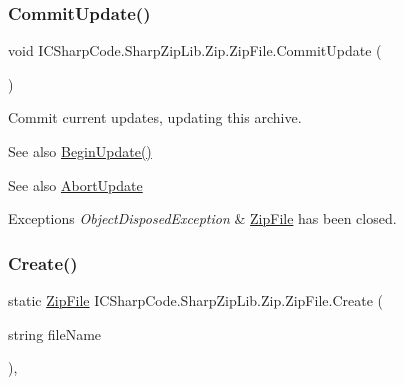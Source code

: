 \subsubsection{\texorpdfstring{Commit\+Update()}{CommitUpdate()}}
{\footnotesize\ttfamily void I\+C\+Sharp\+Code.\+Sharp\+Zip\+Lib.\+Zip.\+Zip\+File.\+Commit\+Update (\begin{DoxyParamCaption}{ }\end{DoxyParamCaption})\hspace{0.3cm}{\ttfamily [inline]}}



Commit current updates, updating this archive. 

\begin{DoxySeeAlso}{See also}
\hyperlink{class_i_c_sharp_code_1_1_sharp_zip_lib_1_1_zip_1_1_zip_file_a938dbbc553b0dc77b2c4914cec1da8a5}{Begin\+Update()}


\end{DoxySeeAlso}


\begin{DoxySeeAlso}{See also}
\hyperlink{class_i_c_sharp_code_1_1_sharp_zip_lib_1_1_zip_1_1_zip_file_a2c0a4ecff350786d09c0e4ad0e15fdc8}{Abort\+Update}


\end{DoxySeeAlso}



\begin{DoxyExceptions}{Exceptions}
{\em Object\+Disposed\+Exception} & \hyperlink{class_i_c_sharp_code_1_1_sharp_zip_lib_1_1_zip_1_1_zip_file}{Zip\+File} has been closed.\\
\hline
\end{DoxyExceptions}
\mbox{\label{class_i_c_sharp_code_1_1_sharp_zip_lib_1_1_zip_1_1_zip_file_af32411ce024f000e0590d8d7e9e392de}} 
\subsubsection{\texorpdfstring{Create()}{Create()}\hspace{0.1cm}{\footnotesize\ttfamily [1/2]}}
{\footnotesize\ttfamily static \hyperlink{class_i_c_sharp_code_1_1_sharp_zip_lib_1_1_zip_1_1_zip_file}{Zip\+File} I\+C\+Sharp\+Code.\+Sharp\+Zip\+Lib.\+Zip.\+Zip\+File.\+Create (\begin{DoxyParamCaption}\item[{string}]{file\+Name }\end{DoxyParamCaption})\hspace{0.3cm}{\ttfamily [inline]}, {\ttfamily [static]}}



